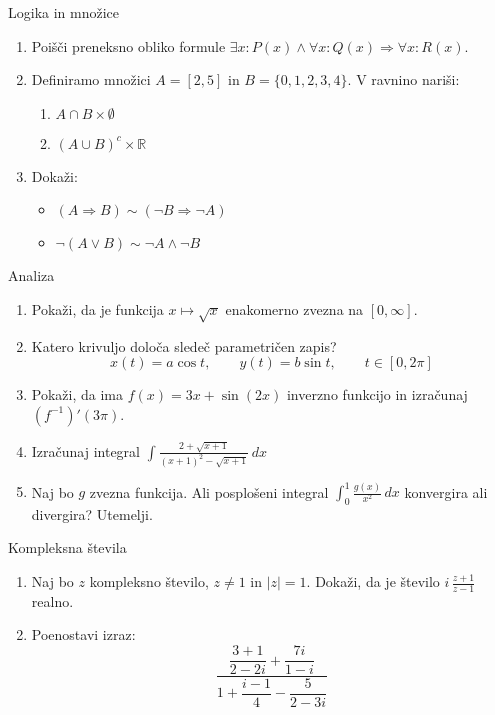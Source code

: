 \begin{frame}{Logika in množice}
	\begin{enumerate}
		\item
		Poišči preneksno obliko formule $\exists x: P(x) \land \forall x: Q(x) \Rightarrow \forall x: R(x)$.
		\item 
		Definiramo množici $A = [2,5]$ in $B=\{0,1,2,3,4\}$.
		V ravnino nariši:
		\begin{enumerate}
		   \item $A \cap B \times \emptyset$
		   \item $(A \cup B)^c \times \mathbb{R}$
		\end{enumerate}
		\item
		Dokaži:
		\begin{itemize}
			\item $(A\Rightarrow B) \sim (\lnot B \Rightarrow \lnot A)$
			\item $\lnot(A \lor B) \sim \lnot A \land \lnot B$
		\end{itemize}
	\end{enumerate}
\end{frame}

\begin{frame}{Analiza}
	\begin{enumerate}
		\item
		Pokaži, da je funkcija $x \mapsto \sqrt{x}$ enakomerno zvezna na $[0,\infty]$.
		\item 
		Katero krivuljo določa sledeč parametričen zapis?
		$$
		   x(t) = a \cos t, \qquad %
		   y(t) = b \sin t, \qquad %
		   t \in [0, 2 \pi]
		$$ 
		\item
		Pokaži, da ima $f(x) = 3x+\sin(2x)$ inverzno funkcijo in izračunaj $(f^{-1})'(3\pi)$.
		
		\item
		Izračunaj integral 
		$ \displaystyle \int \frac{2+\sqrt{x+1}}{(x+1)^2-\sqrt{x+1}} \, dx$
		\item 
		Naj bo $g$ zvezna funkcija. Ali posplošeni integral 
		$ \int_{0}^{1} \frac{g(x)}{x^2} \, dx$
		konvergira ali divergira? Utemelji.
	\end{enumerate}
\end{frame}

\begin{frame}{Kompleksna števila}
	\begin{enumerate}
		\item
		Naj bo $z$ kompleksno število, $z \ne 1$ in $|z| = 1$.
		Dokaži, da je število \( i \, \frac{z+1}{z-1} \) realno.
		\item
		Poenostavi izraz:
		$$\frac{\dfrac{3+1}{2-2i}+\dfrac{7i}{1-i}}{1+\dfrac{i-1}{4}-\dfrac{5}{2-3i}} $$
	\end{enumerate}
\end{frame}